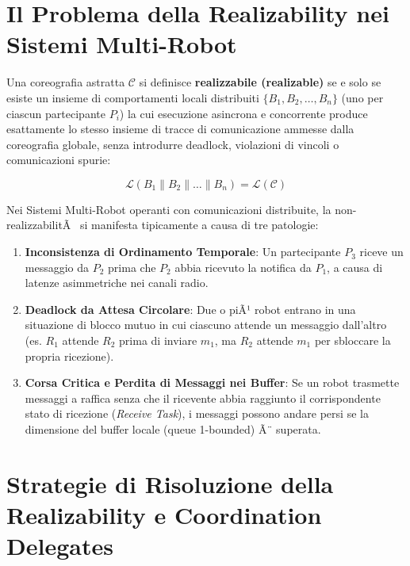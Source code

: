 ﻿\documentclass[11pt, a4paper]{report}
\begin{document}
\section{Il Problema della Realizability nei Sistemi Multi-Robot}

Una coreografia astratta $\mathcal{C}$ si definisce \textbf{realizzabile (realizable)} se e solo se esiste un insieme di comportamenti locali distribuiti $\{B_1, B_2, \dots, B_n\}$ (uno per ciascun partecipante $P_i$) la cui esecuzione asincrona e concorrente produce esattamente lo stesso insieme di tracce di comunicazione ammesse dalla coreografia globale, senza introdurre deadlock, violazioni di vincoli o comunicazioni spurie:

$$\mathcal{L}(B_1 \parallel B_2 \parallel \dots \parallel B_n) = \mathcal{L}(\mathcal{C})$$

Nei Sistemi Multi-Robot operanti con comunicazioni distribuite, la non-realizzabilitÃ  si manifesta tipicamente a causa di tre patologie:
\begin{enumerate}
    \item \textbf{Inconsistenza di Ordinamento Temporale}: Un partecipante $P_3$ riceve un messaggio da $P_2$ prima che $P_2$ abbia ricevuto la notifica da $P_1$, a causa di latenze asimmetriche nei canali radio.
    \item \textbf{Deadlock da Attesa Circolare}: Due o piÃ¹ robot entrano in una situazione di blocco mutuo in cui ciascuno attende un messaggio dall'altro (es. $R_1$ attende $R_2$ prima di inviare $m_1$, ma $R_2$ attende $m_1$ per sbloccare la propria ricezione).
    \item \textbf{Corsa Critica e Perdita di Messaggi nei Buffer}: Se un robot trasmette messaggi a raffica senza che il ricevente abbia raggiunto il corrispondente stato di ricezione (\textit{Receive Task}), i messaggi possono andare persi se la dimensione del buffer locale (queue 1-bounded) Ã¨ superata.
\end{enumerate}

\section{Strategie di Risoluzione della Realizability e Coordination Delegates}
\end{document}

